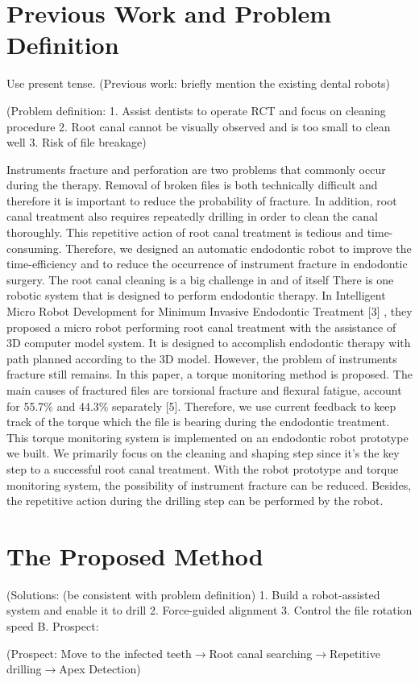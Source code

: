 \section{Previous Work and Problem Definition}
Use present tense.
(Previous work: briefly mention the existing dental robots)
\par\noindent
(Problem definition:
1.	Assist dentists to operate RCT and focus on cleaning procedure
2.	Root canal cannot be visually observed and is too small to clean well
3.	Risk of file breakage)		
\par\noindent
Instruments fracture and perforation are two problems that commonly occur during the therapy. Removal of broken files is both technically difficult and therefore it is important to reduce the probability of fracture. In addition, root canal treatment also requires repeatedly drilling in order to clean the canal thoroughly.  This repetitive action of root canal treatment is tedious and time-consuming. Therefore, we designed an automatic endodontic robot to improve the time-efficiency and to reduce the occurrence of instrument fracture in endodontic surgery.
The root canal cleaning is a big challenge in and of itself
There is one robotic system that is designed to perform endodontic therapy. In Intelligent Micro Robot Development for Minimum Invasive Endodontic Treatment [3] , they proposed a micro robot performing root canal treatment with the assistance of 3D computer model system. It is designed to accomplish endodontic therapy with path planned according to the 3D model. However, the problem of instruments fracture still remains. 
In this paper, a torque monitoring method is proposed. The main causes of fractured files are torsional fracture and flexural fatigue, account for 55.7\% and 44.3\% separately [5]. Therefore, we use current feedback to keep track of the torque which the file is bearing during the endodontic treatment. This torque monitoring system is implemented on an endodontic robot prototype we built. We primarily focus on the cleaning and shaping step since it’s the key step to a successful root canal treatment. With the robot prototype and torque monitoring system, the possibility of instrument fracture can be reduced. Besides, the repetitive action during the drilling step can be performed by the robot.			
\section{The Proposed Method}
(Solutions: (be consistent with problem definition)
1.	Build a robot-assisted system and enable it to drill
2.	Force-guided alignment 
3.	Control the file rotation speed
B.	Prospect:
\par\noindent
(Prospect: Move to the infected teeth$\longrightarrow $Root canal searching$\longrightarrow $Repetitive drilling$\longrightarrow $Apex Detection)						
